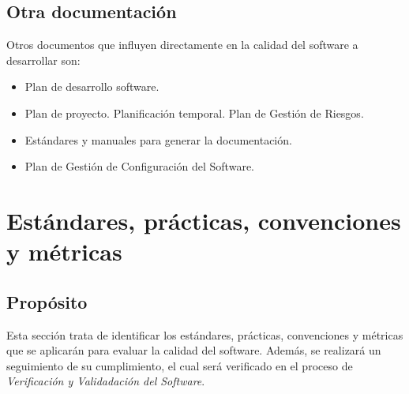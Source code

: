 \documentclass[11pt, a4paper, twoside, titlepage]{article}
\begin{document}
		\subsection{Otra documentación} 
			Otros documentos que influyen directamente en la calidad del software a desarrollar son:
			\begin{itemize}
				\item Plan de desarrollo software.
				\item Plan de proyecto.
					\subitem Planificación temporal.
					\subitem Plan de Gestión de Riesgos.
				\item Estándares y manuales para generar la documentación.
				\item Plan de Gestión de Configuración del Software.
			\end{itemize}
			
	\section{Estándares, prácticas, convenciones y métricas}%
		\subsection{Propósito}
			Esta sección trata de identificar los estándares, prácticas, convenciones y métricas que se aplicarán para evaluar la calidad del software. Además, se realizará un seguimiento de su cumplimiento, el cual será verificado en el proceso de  \textit{Verificación y Validadación del Software}.
\end{document}
